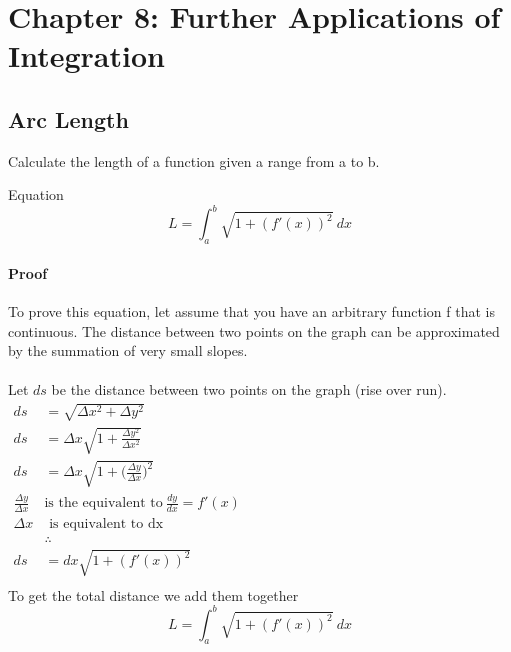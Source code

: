 \documentclass[letterpaper,10pt,twoside,twocolumn,openany]{book}
\begin{document}
\chapter{Chapter 8: Further Applications of Integration}
\section{Arc Length}
Calculate the length of a function given a range from a to b.
\begin{paperbox}{Equation}
    \begin{equation}
        L = \int_a^b \sqrt{1 + (f'(x))^2}\ dx
    \end{equation}
\end{paperbox}
\subsubsection{Proof}
To prove this equation, let assume that you have an arbitrary function f that is continuous. The distance between two points on the graph can be approximated by the summation of very small slopes.
\\~\\ 
Let $ds$ be the distance between two points on the graph (rise over run).\\  
$\begin{aligned}
    ds &= \sqrt{\Delta x^2 + \Delta y^2}\\ 
    ds &= \Delta x \sqrt{1 + \frac{\Delta y^2}{\Delta x^2}}\\ 
    ds &= \Delta x \sqrt{1 + \biggl(\frac{\Delta y}{\Delta x}\biggl)^2}\\
    \frac{\Delta y}{\Delta x}\ &\text{is the equivalent to}\ \frac{dy}{dx} = f'(x)\\
    \Delta x &\text{ is equivalent to dx}\\
    &\therefore\\ 
    ds &= dx \sqrt{1 + (f'(x))^2}\\
\end{aligned}$\\
To get the total distance we add them together 
\begin{equation*}
    L = \int_a^b \sqrt{1 + (f'(x))^2}\ dx
\end{equation*}
\end{document}
